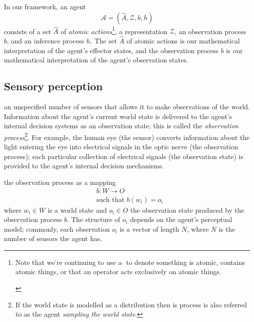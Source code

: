 In our framework, an agent
\begin{equation}
    \mathscr{A} = (\hat{A}, \mathscr{Z}, b, h)
\end{equation}
consists of a set $\hat{A}$ of \emph{atomic actions}\footnote{
\begin{notation}
    Note that we're continuing to use a $\hat{}$ to denote something is atomic, contains atomic things, or that an operator acts exclusively on atomic things.
\end{notation}
}, a representation $\mathscr{Z}$, an observation process $b$, and an inference process $h$.
The set $\hat{A}$ of atomic actions is our mathematical interpretation of the agent's effector states, and the observation process $b$ is our mathematical interpretation of the agent's observation states.

\subsection{Sensory perception}

 an unspecified number of sensors that allows it to make observations of the world.
Information about the agent's current world state is delivered to the agent's internal decision systems as an observation state; this is called the \emph{observation process}\footnote{
If the world state is modelled as a distribution then is process is also referred to as the agent \emph{sampling the world state}.
}.
For example, the human eye (the sensor) converts information about the light entering the eye into electrical signals in the optic nerve (the observation process); each particular collection of electrical signals (the observation state) is provided to the agent's internal decision mechanisms.

 the observation process as a mapping
\begin{equation}
\begin{aligned}
	& b: W \to O \\
	& \text{such that } b(w_{i}) = o_{i}
\end{aligned}
\end{equation}
where $w_{i} \in W$ is a world state and $o_{i} \in O$ the observation state produced by the observation process $b$.
The structure of $o_{i}$ depends on the agent's perceptual model; commonly, each observation $o_{i}$ is a vector of length $N$, where $N$ is the number of sensors the agent has.

